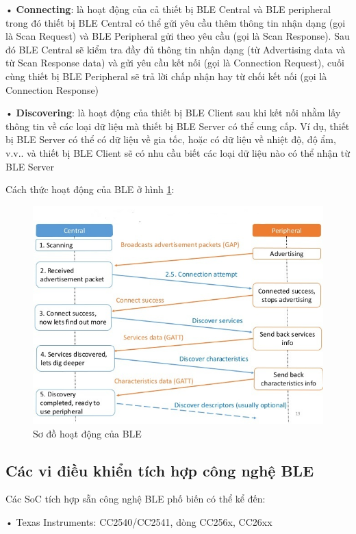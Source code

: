 • \textbf{Connecting}: là hoạt động của cả thiết bị BLE Central và BLE peripheral trong đó thiết bị BLE Central có thể gửi yêu cầu thêm thông tin nhận dạng (gọi là Scan Request) và BLE Peripheral gửi theo yêu cầu (gọi là Scan Response). Sau đó BLE Central sẽ kiểm tra đầy đủ thông tin nhận dạng (từ Advertising data và từ Scan Response data) và gửi yêu cầu kết nối (gọi là Connection Request), cuối cùng thiết bị BLE Peripheral sẽ trả lời chấp nhận hay từ chối kết nối (gọi là Connection Response)

• \textbf{Discovering}: là hoạt động của thiết bị BLE Client sau khi kết nối nhằm lấy thông tin về các loại dữ liệu mà thiết bị BLE Server có thể cung cấp. Ví dụ, thiết bị BLE Server có thể có dữ liệu về gia tốc, hoặc có dữ liệu về nhiệt độ, độ ẩm, v.v.. và thiết bị BLE Client sẽ có nhu cầu biết các loại dữ liệu nào có thể nhận từ BLE Server

Cách thức hoạt động của BLE ở hình \ref{fig: btwork}:
	\begin{figure}[h]
		\includegraphics[width=1.0\textwidth]{btwork}
		\caption[Sơ đồ hoạt động của BLE]{Sơ đồ hoạt động của BLE}
		\label{fig: btwork}
	\end{figure}
	
\newpage
\subsection{Các vi điều khiển tích hợp công nghệ BLE}
Các SoC tích hợp sẵn công nghệ BLE phố biến có thể kể đến:

• Texas Instruments: CC2540/CC2541, dòng CC256x, CC26xx

